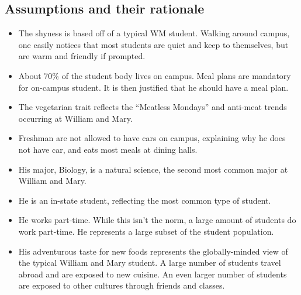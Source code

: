 \documentclass[5pt]{article} %
\begin{document}

\subsection{Assumptions and their rationale}
\begin{itemize}
\item The shyness is based off of a typical WM student. Walking around campus, one easily notices that most students are quiet and keep to themselves, but are warm and friendly if prompted.
\item About 70\% of the student body lives on campus. Meal plans are mandatory for on-campus student. It is then justified that he should have a meal plan. 
\item The vegetarian trait reflects the “Meatless Mondays” and anti-meat trends occurring at William and Mary. 
\item Freshman are not allowed to have cars on campus, explaining why he does not have car, and eats most meals at dining halls. 
\item His major, Biology, is a natural science, the second most common major at William and Mary. 
\item He is an in-state student, reflecting the most common type of student. 
\item He works part-time. While this isn’t the norm, a large amount of students do work part-time. He represents a large subset of the student population. 
\item His adventurous taste for new foods represents the globally-minded view of the typical William and Mary student. A large number of students travel abroad and are exposed to new cuisine. An even larger number of students are exposed to other cultures through friends and classes. 
\end{itemize}
\end{document}
